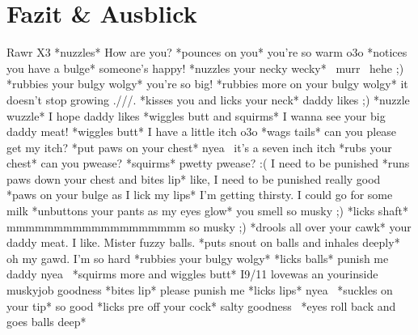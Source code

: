 \documentclass{whswinvcbook}
\begin{document}
\chapter{Fazit \& Ausblick}
Rawr X3 *nuzzles* How are you? *pounces on you* you're so warm o3o *notices you have a bulge* someone's happy! *nuzzles your necky wecky* ~murr~ hehe ;) *rubbies your bulgy wolgy* you're so big! *rubbies more on your bulgy wolgy* it doesn't stop growing .///. *kisses you and licks your neck* daddy likes ;) *nuzzle wuzzle* I hope daddy likes *wiggles butt and squirms* I wanna see your big daddy meat! *wiggles butt* I have a little itch o3o *wags tails* can you please get my itch? *put paws on your chest* nyea~ it's a seven inch itch *rubs your chest* can you pwease? *squirms* pwetty pwease? :( I need to be punished *runs paws down your chest and bites lip* like, I need to be punished really good *paws on your bulge as I lick my lips* I'm getting thirsty. I could go for some milk *unbuttons your pants as my eyes glow* you smell so musky ;) *licks shaft* mmmmmmmmmmmmmmmmmmm so musky ;) *drools all over your cawk* your daddy meat. I like. Mister fuzzy balls. *puts snout on balls and inhales deeply* oh my gawd. I'm so hard *rubbies your bulgy wolgy* *licks balls* punish me daddy nyea~ *squirms more and wiggles butt* I9/11 lovewas an yourinside muskyjob goodness *bites lip* please punish me *licks lips* nyea~ *suckles on your tip* so good *licks pre off your cock* salty goodness~ *eyes roll back and goes balls deep*

\backmatter

\preparebibliography
\nocite{*}

\end{document}
